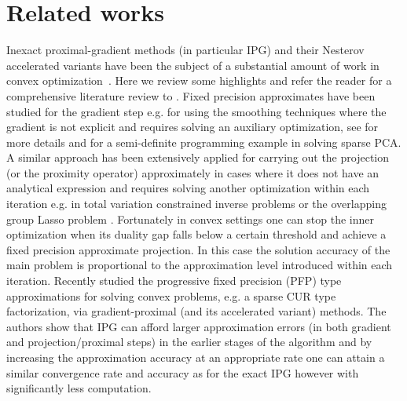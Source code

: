 \section{Related works}\label{sec:SOA}

Inexact proximal-gradient methods (in particular IPG)  and their Nesterov accelerated variants have been the subject of a substantial amount of work in convex optimization~\cite{Nesterov-inexact,dasper-inexact,villa:inexactFISTA,BachinexactIPG,charles:inexactFISTA}. Here we review some highlights and refer the reader for a comprehensive literature review to \cite{BachinexactIPG}.
Fixed precision approximates have been studied 
for the gradient step e.g. for using the smoothing techniques where the gradient is not explicit and requires solving an auxiliary optimization, see for more details \cite{Nesterov-inexact} and \cite{dasper-inexact} for a semi-definite programming example in solving sparse PCA. A similar approach has been extensively applied for carrying out the projection (or the proximity operator) approximately in cases where it does not have an analytical expression and requires solving another optimization within each iteration  e.g. in total variation constrained inverse problems \cite{TVprojGabirel,Chambolle2011} or the overlapping group Lasso problem \cite{FoGLasso}. Fortunately in convex settings %
one can stop the inner optimization when its duality gap falls below a certain threshold and achieve a fixed precision approximate projection. In this case the solution accuracy of the main problem is proportional to the approximation level introduced within each iteration. Recently \cite{BachinexactIPG} studied the progressive fixed precision (PFP) type approximations for solving convex problems, e.g. a sparse CUR type factorization, via gradient-proximal (and its accelerated variant) methods. The authors show that IPG can afford  larger approximation errors (in both gradient and projection/proximal steps) in the earlier stages of the algorithm and by increasing the approximation accuracy at an appropriate rate one can attain a similar convergence rate and accuracy as for the exact IPG however with significantly less computation.

